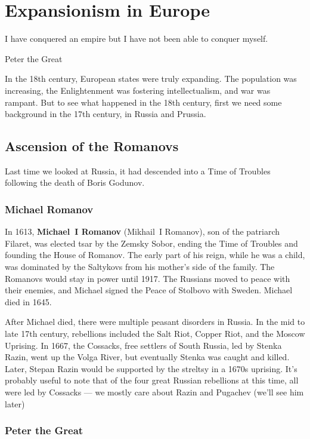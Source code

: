 \chapter{Expansionism in Europe}

\epigraph{%
  I have conquered an empire but I have not been able to conquer myself.
}{Peter the Great}

In the 18th century, European states were truly expanding.
The population was increasing, the Enlightenment was fostering intellectualism, and war was rampant.
But to see what happened in the 18th century, first we need some background in the 17th century,
in Russia and Prussia.

\section{Ascension of the Romanovs}

Last time we looked at Russia,
it had descended into a Time of Troubles following the death of Boris Godunov.

\subsection*{Michael Romanov}

In 1613, \textbf{Michael~I Romanov} (Mikhail~I Romanov), son of the patriarch Filaret,
was elected tsar by the Zemsky Sobor,
ending the Time of Troubles and founding the House of Romanov.
The early part of his reign, while he was a child,
was dominated by the Saltykovs from his mother's side of the family.
The Romanovs would stay in power until 1917.
The Russians moved to peace with their enemies,
and Michael signed the Peace of Stolbovo with Sweden.
Michael died in 1645.

After Michael died, there were multiple peasant disorders in Russia.
In the mid to late 17th century, rebellions included the
Salt Riot, Copper Riot, and the Moscow Uprising.
In 1667, the Cossacks, free settlers of South Russia, led by Stenka Razin,
went up the Volga River, but eventually Stenka was caught and killed.
Later, Stepan Razin would be supported by the streltsy in a 1670s uprising.
It's probably useful to note that of the four great Russian rebellions at this time,
all were led by Cossacks --- we mostly care about Razin and Pugachev (we'll see him later)

\subsection*{Peter the Great}

